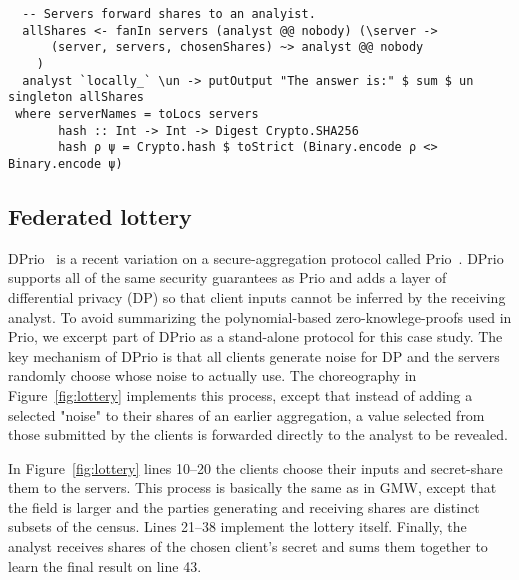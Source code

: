 \documentclass[sigplan,screen,review,anonymous]{acmart}
\newcommand{\inlinecode}[2][haskell]{\texttt{#2}}
\begin{document}
\begin{figure*}
\begin{mdframed}
\begin{verbatim}
  -- Servers forward shares to an analyist.
  allShares <- fanIn servers (analyst @@ nobody) (\server ->
      (server, servers, chosenShares) ~> analyst @@ nobody
    )
  analyst `locally_` \un -> putOutput "The answer is:" $ sum $ un singleton allShares
 where serverNames = toLocs servers
       hash :: Int -> Int -> Digest Crypto.SHA256
       hash ρ ψ = Crypto.hash $ toStrict (Binary.encode ρ <> Binary.encode ψ)
\end{verbatim}
\caption{A federated-lottery protocol.
  One of the secret values chosen by the clients is revealed to the analyst;
  as long as at least one server acts honestly
  (randomly generates their \inlinecode{ρ} on line 22),
  the choice of which value to reveal will be random.
  Only the analyst learns any of the clients' secrets;
  they only learn the one secret, and they do not learn which one it was.
  The algorithm-step numbers and the unicode variable names align with
  the instructions in Section 6.2 of Keller~\textit{et~al}~\cite{dprio2023}.
  Client secrets are chosen at-will from a finite field (the type \inlinecode{Fp});
  we used the finite field of size 999983.}
\label{fig:lottery}
\end{mdframed}
\end{figure*}

\subsection{Federated lottery}
DPrio~\cite{dprio2023} is a recent variation on a secure-aggregation
protocol called Prio~\cite{prio2017}.
DPrio supports all of the same security guarantees as Prio and adds a layer of
differential privacy (DP)
so that client inputs cannot be inferred by the receiving analyst.
To avoid summarizing the polynomial-based zero-knowlege-proofs used in Prio,
we excerpt part of DPrio as a stand-alone protocol for this case study.
The key mechanism of DPrio is that all clients generate noise for DP and
the servers randomly choose whose noise to actually use.
The choreography in Figure~\ref{fig:lottery} implements this process,
except that instead of adding a selected "noise" to their shares of an earlier aggregation,
a value selected from those submitted by the clients is forwarded directly to the analyst
to be revealed.

In Figure~\ref{fig:lottery} lines 10--20 the clients choose their inputs and secret-share them to
the servers.
This process is basically the same as in GMW, except that the field is larger
and the parties generating and receiving shares are distinct subsets of the census.
Lines 21--38 implement the lottery itself.
Finally, the analyst receives shares of the chosen client's secret and sums them together to
learn the final result on line 43.
\end{document}
